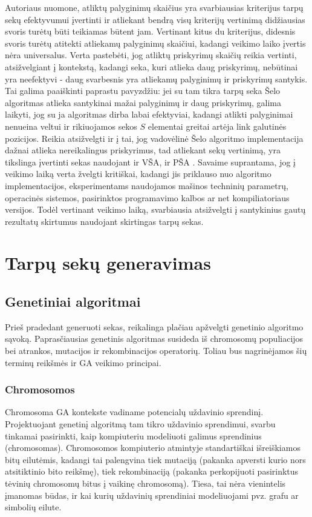 \documentclass{VUMIFInfKursinis}
\begin{document}
Autoriaus nuomone, atliktų palyginimų skaičius yra svarbiausias kriterijus tarpų sekų efektyvumui įvertinti ir
atliekant bendrą visų kriterijų vertinimą didžiausias svoris turėtų būti teikiamas būtent jam.
Vertinant kitus du kriterijus, didesnis svoris turėtų atitekti atliekamų palyginimų skaičiui,
kadangi veikimo laiko įvertis nėra universalus.
Verta pastebėti, jog atliktų priskyrimų skaičių reikia vertinti, atsižvelgiant į kontekstą, kadangi
seka, kuri atlieka daug priskyrimų, nebūtinai yra neefektyvi - daug svarbesnis yra atliekamų palyginimų ir priskyrimų santykis.
Tai galima paaiškinti paprastu pavyzdžiu: jei su tam tikra tarpų seka Šelo algoritmas atlieka santykinai mažai palyginimų ir daug priskyrimų, galima laikyti,
jog su ja algoritmas dirba labai efektyviai, kadangi atlikti palyginimai nenueina veltui ir rikiuojamos sekos $S$ elementai greitai artėja link galutinės pozicijos.
Reikia atsižvelgti ir į tai, jog vadovėlinė Šelo algoritmo implementacija dažnai atlieka nereikalingus priskyrimus,
tad atliekant sekų vertinimą, yra tikslinga įvertinti sekas naudojant ir VŠA, ir PŠA \cite{Radavičius_Baranauskas_2013}.
Savaime suprantama, jog į veikimo laiką verta žvelgti kritiškai, kadangi jis priklauso nuo algoritmo implementacijos,
eksperimentams naudojamos mašinos techninių parametrų, operacinės sistemos, pasirinktos programavimo kalbos ar net kompiliatoriaus versijos.
Todėl vertinant veikimo laiką, svarbiausia atsižvelgti į santykinius gautų rezultatų skirtumus naudojant skirtingas tarpų sekas.

\section{Tarpų sekų generavimas}

\subsection{Genetiniai algoritmai}

Prieš pradedant generuoti sekas, reikalinga plačiau apžvelgti genetinio algoritmo sąvoką.
Paprasčiausias genetinis algoritmas susideda iš chromosomų populiacijos bei atrankos, mutacijos ir rekombinacijos operatorių.
Toliau bus nagrinėjamos šių terminų reikšmės ir GA veikimo principai.

\subsubsection{Chromosomos}

Chromosoma GA kontekste vadiname potencialų uždavinio sprendinį.
Projektuojant genetinį algoritmą tam tikro uždavinio sprendimui, svarbu tinkamai pasirinkti,
kaip kompiuteriu modeliuoti galimus sprendinius (chromosomas).
Chromosomos kompiuterio atmintyje standartiškai išreiškiamos bitų eilutėmis,
kadangi tai palengvina tiek mutaciją (pakanka apversti kurio nors atsitiktinio bito reikšmę),
tiek rekombinaciją (pakanka perkopijuoti pasirinktus tėvinių chromosomų bitus į vaikinę chromosomą).
Tiesa, tai nėra vienintelis įmanomas būdas, ir kai kurių uždavinių sprendiniai modeliuojami pvz. grafu ar simbolių eilute.
\end{document}
